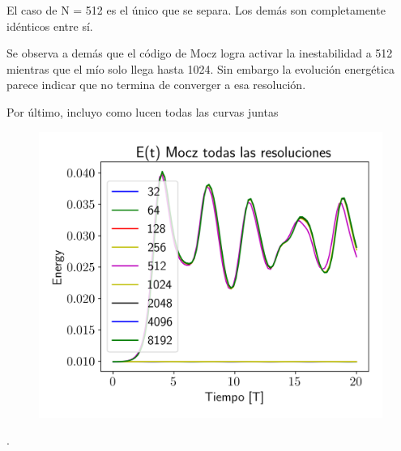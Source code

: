\documentclass[notitlepage,letterpaper,12pt]{article} %
\begin{document}
El caso de N = 512 es el único que se separa. Los demás son completamente idénticos entre sí.

Se observa a demás que el código de Mocz logra activar la inestabilidad a 512 mientras que el mío solo llega hasta 1024. Sin embargo la evolución energética parece indicar que no termina de converger a esa resolución.






\newpage
Por último, incluyo como lucen todas las curvas juntas

\begin{figure}[h]
  \centering
   \includegraphics[scale= 0.6]{Jeans.png}
  \label{fig: cobre}
\end{figure}	













                      





.
\end{document}

